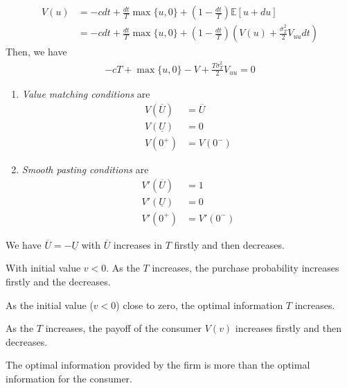 \documentclass[11pt]{elegantbook}
\begin{document}
\begin{equation}
    \begin{aligned}
        V(u)&=-cdt+\frac{dt}{T}\max\{u,0\}+\left(1-\frac{dt}{T}\right)\mathbb{E}[u+du]\\
        &=-cdt+\frac{dt}{T}\max\{u,0\}+\left(1-\frac{dt}{T}\right)\left(V(u)+\frac{\bar{\sigma}_T^2}{2}V_{uu}dt\right)
    \end{aligned}
    \nonumber
\end{equation}
Then, we have
\begin{equation}
    \begin{aligned}
        -cT+\max\{u,0\}-V+\frac{T\bar{\sigma}_T^2}{2}V_{uu}=0
    \end{aligned}
    \nonumber
\end{equation}
\begin{enumerate}
    \item \textit{Value matching conditions} are
    \begin{equation}
        \begin{aligned}
            V(\overline{U})&=\overline{U}\\
            V(\underline{U})&=0\\
            V(0^+)&=V(0^-)
        \end{aligned}
        \nonumber
    \end{equation}
    \item \textit{Smooth pasting conditions} are
    \begin{equation}
        \begin{aligned}
            V'(\overline{U})&=1\\
            V'(\underline{U})&=0\\
            V'(0^+)&=V'(0^-)
        \end{aligned}
        \nonumber
    \end{equation}
\end{enumerate}
We have $\overline{U}=-\underline{U}$ with $\overline{U}$ increases in $T$ firstly and then decreases.

With initial value $v<0$. As the $T$ increases, the purchase probability increases firstly and the decreases.

As the initial value ($v<0$) close to zero, the optimal information $T$ increases.

As the $T$ increases, the payoff of the consumer $V(v)$ increases firstly and then decreases.

The optimal information provided by the firm is more than the optimal information for the consumer.
\end{document}
